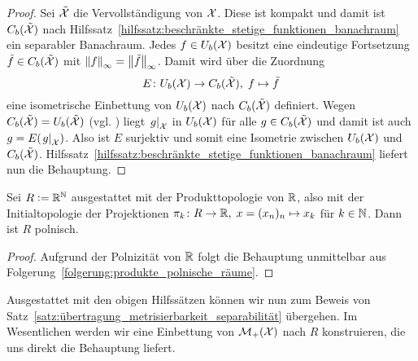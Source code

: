 \documentclass[../thesis/thesis.tex]{subfiles}
\begin{document}
	\begin{proof}
		Sei $\tilde{\mathcal{X}}$ die Vervollständigung von $\mathcal{X}$. Diese ist kompakt und damit ist $C_b(\tilde{\mathcal{X}})$ nach Hilfssatz~\ref{hilfssatz:beschränkte_stetige_funktionen_banachraum} ein separabler Banachraum.
		Jedes $f \in U_b(\mathcal{X})$ besitzt eine eindeutige Fortsetzung $\tilde{f} \in C_b(\tilde{\mathcal{X}})$ mit $\left\lVert f\right\rVert_\infty = \left\lVert\tilde{f}\right\rVert_\infty$. Damit wird über die Zuordnung
		\[ E \colon U_b(\mathcal{X}) \to C_b(\tilde{\mathcal{X}}), \; f \mapsto \tilde{f}  \]
		eine isometrische Einbettung von $U_b(\mathcal{X})$ nach $C_b(\tilde{\mathcal{X}})$ definiert. 
		Wegen $C_b(\tilde{\mathcal{X}}) = U_b(\tilde{\mathcal{X}})$ (vgl. \cite[Theorem 2.4.1]{Simon.2015}) liegt $\left.g\right|_{\mathcal{X}}$ in $U_b(\mathcal{X})$ für alle $g \in C_b(\tilde{\mathcal{X}})$ und damit ist
		auch $g = E(\left.g\right|_{\mathcal{X}})$. Also ist $E$ surjektiv und somit eine Isometrie zwischen $U_b(\mathcal{X})$ und $C_b(\tilde{\mathcal{X}})$. Hilfssatz~\ref{hilfssatz:beschränkte_stetige_funktionen_banachraum} liefert nun die Behauptung.
	\end{proof}
	
	\begin{Hilfssatz}
		\label{hilfssatz:einbettungsraum_R}
		Sei $R \vcentcolon = \mathbb{R}^{\mathbb{N}}$ ausgestattet mit der Produkttopologie von $\mathbb{R}$, also mit der Initialtopologie der Projektionen $\pi_k \colon R \to \mathbb{R}, \; x = (x_n)_n \mapsto x_k $ für $k \in \mathbb{N}$. Dann ist $R$ 
		polnisch.
	\end{Hilfssatz}
	
	\begin{proof}
		Aufgrund der Polnizität von $\mathbb{R}$ folgt die Behauptung unmittelbar aus Folgerung~\ref{folgerung:produkte_polnische_räume}.
	\end{proof}

	Ausgestattet mit den obigen Hilfssätzen können wir nun zum Beweis von Satz~\ref{satz:übertragung_metrisierbarkeit_separabilität} übergehen. Im Wesentlichen werden wir eine Einbettung von $\mathcal{M}_{+}(\mathcal{X})$ nach $R$ konstruieren, die uns direkt die Behauptung liefert.
	
\end{document}
